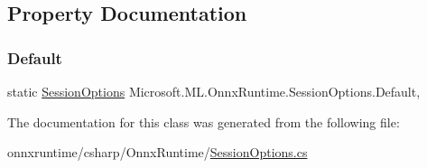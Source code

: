 \subsection{Property Documentation}
\mbox{\label{classMicrosoft_1_1ML_1_1OnnxRuntime_1_1SessionOptions_aaf6f7a33767c576c1364552114968f02}} 
\subsubsection{\texorpdfstring{Default}{Default}}
{\footnotesize\ttfamily static \mbox{\hyperlink{classMicrosoft_1_1ML_1_1OnnxRuntime_1_1SessionOptions}{Session\+Options}} Microsoft.\+M\+L.\+Onnx\+Runtime.\+Session\+Options.\+Default\hspace{0.3cm}{\ttfamily [static]}, {\ttfamily [get]}}



The documentation for this class was generated from the following file\+:\begin{DoxyCompactItemize}
\item 
onnxruntime/csharp/\+Onnx\+Runtime/\mbox{\hyperlink{OnnxRuntime_2SessionOptions_8cs}{Session\+Options.\+cs}}\end{DoxyCompactItemize}

